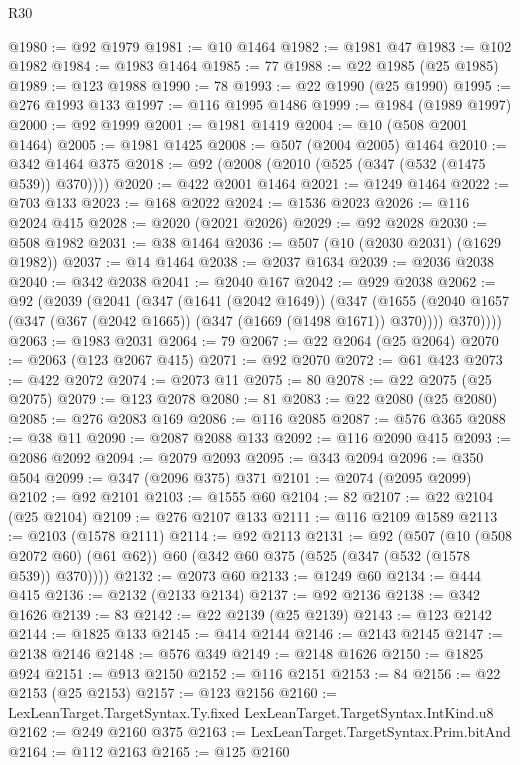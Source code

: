 \begin{lexlean}{R30}
\begin{coremodule}
@1980 := @92 @1979
@1981 := @10 @1464
@1982 := @1981 @47
@1983 := @102 @1982
@1984 := @1983 @1464
@1985 := 77
@1988 := @22 @1985 (@25 @1985)
@1989 := @123 @1988
@1990 := 78
@1993 := @22 @1990 (@25 @1990)
@1995 := @276 @1993 @133
@1997 := @116 @1995 @1486
@1999 := @1984 (@1989 @1997)
@2000 := @92 @1999
@2001 := @1981 @1419
@2004 := @10 (@508 @2001 @1464)
@2005 := @1981 @1425
@2008 := @507 (@2004 @2005) @1464
@2010 := @342 @1464 @375
@2018 := @92 (@2008 (@2010 (@525 (@347 (@532 (@1475 @539)) @370))))
@2020 := @422 @2001 @1464
@2021 := @1249 @1464
@2022 := @703 @133
@2023 := @168 @2022
@2024 := @1536 @2023
@2026 := @116 @2024 @415
@2028 := @2020 (@2021 @2026)
@2029 := @92 @2028
@2030 := @508 @1982
@2031 := @38 @1464
@2036 := @507 (@10 (@2030 @2031) (@1629 @1982))
@2037 := @14 @1464
@2038 := @2037 @1634
@2039 := @2036 @2038
@2040 := @342 @2038
@2041 := @2040 @167
@2042 := @929 @2038
@2062 := @92
    (@2039
      (@2041
        (@347
          (@1641 (@2042 @1649))
          (@347
            (@1655 (@2040 @1657 (@347 (@367 (@2042 @1665)) (@347 (@1669 (@1498 @1671)) @370))))
            @370))))
@2063 := @1983 @2031
@2064 := 79
@2067 := @22 @2064 (@25 @2064)
@2070 := @2063 (@123 @2067 @415)
@2071 := @92 @2070
@2072 := @61 @423
@2073 := @422 @2072
@2074 := @2073 @11
@2075 := 80
@2078 := @22 @2075 (@25 @2075)
@2079 := @123 @2078
@2080 := 81
@2083 := @22 @2080 (@25 @2080)
@2085 := @276 @2083 @169
@2086 := @116 @2085
@2087 := @576 @365
@2088 := @38 @11
@2090 := @2087 @2088 @133
@2092 := @116 @2090 @415
@2093 := @2086 @2092
@2094 := @2079 @2093
@2095 := @343 @2094
@2096 := @350 @504
@2099 := @347 (@2096 @375) @371
@2101 := @2074 (@2095 @2099)
@2102 := @92 @2101
@2103 := @1555 @60
@2104 := 82
@2107 := @22 @2104 (@25 @2104)
@2109 := @276 @2107 @133
@2111 := @116 @2109 @1589
@2113 := @2103 (@1578 @2111)
@2114 := @92 @2113
@2131 := @92
    (@507
      (@10 (@508 @2072 @60) (@61 @62))
      @60
      (@342 @60 @375 (@525 (@347 (@532 (@1578 @539)) @370))))
@2132 := @2073 @60
@2133 := @1249 @60
@2134 := @444 @415
@2136 := @2132 (@2133 @2134)
@2137 := @92 @2136
@2138 := @342 @1626
@2139 := 83
@2142 := @22 @2139 (@25 @2139)
@2143 := @123 @2142
@2144 := @1825 @133
@2145 := @414 @2144
@2146 := @2143 @2145
@2147 := @2138 @2146
@2148 := @576 @349
@2149 := @2148 @1626
@2150 := @1825 @924
@2151 := @913 @2150
@2152 := @116 @2151
@2153 := 84
@2156 := @22 @2153 (@25 @2153)
@2157 := @123 @2156
@2160 := LexLeanTarget.TargetSyntax.Ty.fixed LexLeanTarget.TargetSyntax.IntKind.u8
@2162 := @249 @2160 @375
@2163 := LexLeanTarget.TargetSyntax.Prim.bitAnd
@2164 := @112 @2163
@2165 := @125 @2160

\end{coremodule}
\end{lexlean}
